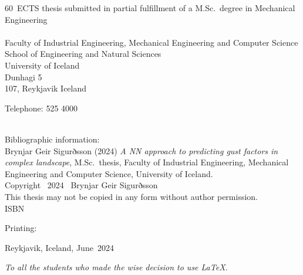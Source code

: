 \documentclass[a4paper,12pt,twoside,BCOR=10mm]{scrbook}
\def\thesisyear{2024}       					%
\def\thesismonth{June}					%
\def\thesisauthor{Brynjar Geir Sigurðsson}				%
\def\thesistitle{A NN approach to predicting gust factors in complex landscape} %
\def\thesiscredits{60} 						%
\def\thesissubject{Mechanical Engineering}
\def\thesiskind{M.Sc.}					%
\def\thesisschool{School of Engineering and {Natural Sciences}}		%
\def\thesisfaculty{Industrial Engineering, Mechanical Engineering and Computer Science}%
\def\thesisaddress{Dunhagi 5}			        %
\def\thesispostalcode{107}			                %
\def\thesistelephone{525 4000}					%
\def\thesisISBN{}           					%
\def\thesisprinting{}						%
\def\thesislicense{This thesis may not be copied in any form without author permission.} %
\newcommand{\removelinebreaks}[1]{%
  \begingroup\def\\{}#1\endgroup}
\begin{document}
\begin{titlepage}
    
  \thesiscredits ~ECTS thesis submitted in partial fulfillment of a \thesiskind{}~degree in \thesissubject
\\ \\
  Faculty of \thesisfaculty \\
  \thesisschool \\
  University of Iceland \\
  \thesisaddress \\ 
  \thesispostalcode, Reykjavik 
  Iceland

  Telephone: \thesistelephone \\ \\ 
  \vspace*{\lineskip}

  Bibliographic information: \\
  \thesisauthor{} (\thesisyear{}) \emph{\removelinebreaks{\thesistitle{}}}, \thesiskind{}~thesis, Faculty of \thesisfaculty, University of Iceland.\\

  Copyright \textcopyright~\thesisyear~ \thesisauthor \\
  \thesislicense{}\\

  \ifx\thesisISBN\empty %
  \else
  ISBN~\thesisISBN
  \fi
  
  \ifx\thesisprinting\empty %
  \else
  Printing: \thesisprinting \\
  \fi


  Reykjavik, Iceland, \thesismonth~\thesisyear \\
  

  \newpage %

  \thispagestyle{empty} \mbox{}

  \vfill

  \begin{center}
    \textit{
      To all the students who made the wise decision to use \LaTeX. %
    }
  \end{center} \vspace*{5cm}

  \vfill 


\end{titlepage}
\end{document}
